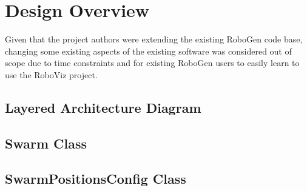 \documentclass[11pt,a4paper]{article}
\begin{document}
\section{Design Overview}
\label{s:design-overview}
%
%
%

Given that the project authors were extending the existing RoboGen
\cite{robogen} code base, changing some existing aspects of the existing
software was considered out of scope due to time constraints and for existing
RoboGen users to easily learn to use the RoboViz project.


\subsection{Layered Architecture Diagram}
\subsection{Swarm Class}
\subsection{SwarmPositionsConfig Class}
\end{document}
